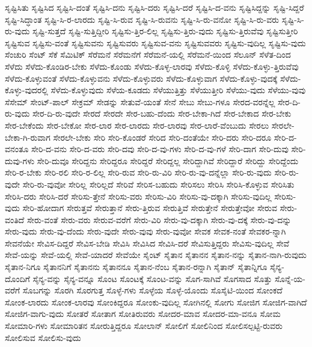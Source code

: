 {ಸೃಷ್ಟಿಸಿತು
ಸೃಷ್ಟಿಸಿದ
ಸೃಷ್ಟಿಸಿ-ದಂತೆ
ಸೃಷ್ಟಿಸಿ-ದನು
ಸೃಷ್ಟಿಸಿ-ದರು
ಸೃಷ್ಟಿಸಿ-ದರೆ
ಸೃಷ್ಟಿಸಿ-ದ-ವನು
ಸೃಷ್ಟಿಸಿದ್ದನ್ನು
ಸೃಷ್ಟಿ-ಸಿದ್ದರೆ
ಸೃಷ್ಟಿ-ಸಿದ್ಧಾಂತ
ಸೃಷ್ಟಿ-ಸಿ-ರ-ಲಾರದು
ಸೃಷ್ಟಿ-ಸಿ-ರುವ
ಸೃಷ್ಟಿ-ಸಿ-ರುವನು
ಸೃಷ್ಟಿ-ಸಿ-ರು-ವನೋ
ಸೃಷ್ಟಿ-ಸಿ-ರು-ವರು
ಸೃಷ್ಟಿ-ಸಿ-ರು-ವುದು
ಸೃಷ್ಟಿ-ಸುತ್ತದೆ
ಸೃಷ್ಟಿ-ಸುತ್ತಿದ್ದೀರಿ
ಸೃಷ್ಟಿಸು-ತ್ತಿರ-ಲಿಲ್ಲ
ಸೃಷ್ಟಿಸು-ತ್ತಿರು-ವುದು
ಸೃಷ್ಟಿಸು-ತ್ತಿರುವೆವು
ಸೃಷ್ಟಿಸುತ್ತೀರಿ
ಸೃಷ್ಟಿಸುವ
ಸೃಷ್ಟಿಸು-ವಂತೆ
ಸೃಷ್ಟಿಸುವನು
ಸೃಷ್ಟಿಸುವರು
ಸೃಷ್ಟಿಸುವ-ವನು
ಸೃಷ್ಟಿಸುವವರು
ಸೃಷ್ಟಿಸು-ವುದಿಲ್ಲ
ಸೃಷ್ಟಿಸು-ವುದು
ಸೆಂಚುರಿ
ಸೆಂಟ್
ಸೆಕೆ
ಸೆಮಿಟಿಕ್
ಸೆರೆಮನೆ
ಸೆರೆಮನೆಗೆ
ಸೆರೆಮನೆ-ಯಲ್ಲಿ
ಸೆರೆಮನೆ-ಯಿಂದ
ಸೆಲೂನ್
ಸೆಳೆತ-ದಿಂದ
ಸೆಳೆದು
ಸೆಳೆದು-ಕೊಂಡಿರ-ಬೇಕು
ಸೆಳೆದು-ಕೊಂಡು
ಸೆಳೆದು-ಕೊಳ್ಳ-ಲಾರವು
ಸೆಳೆದು-ಕೊಳ್ಳಿ
ಸೆಳೆದು-ಕೊಳ್ಳು-ತ್ತಿರುವೆವು
ಸೆಳೆದು-ಕೊಳ್ಳುವಂತೆ
ಸೆಳೆದು-ಕೊಳ್ಳುವನು
ಸೆಳೆದು-ಕೊಳ್ಳುವರು
ಸೆಳೆದು-ಕೊಳ್ಳುವಾಗ
ಸೆಳೆದು-ಕೊಳ್ಳು-ವುದಕ್ಕೆ
ಸೆಳೆದು-ಕೊಳ್ಳು-ವುದರಲ್ಲಿ
ಸೆಳೆದು-ಕೊಳ್ಳುವುದು
ಸೆಳೆಯ-ಕೂಡದು
ಸೆಳೆಯುತ್ತಿತ್ತು
ಸೆಳೆಯುತ್ತೀರಿ
ಸೆಳೆಯು-ವುದು
ಸೆಳೆಯು-ವುವು
ಸೆಸೇಮ್
ಸೇಂಟ್-ಪಾಲ್
ಸೇಕ್ರಮ್
ಸೇಡನ್ನು
ಸೇತುವೆ-ಯಂತೆ
ಸೇನೆ
ಸೇಬು
ಸೇಬು-ಗಳೂ
ಸೇರದ-ವರನ್ನೆಲ್ಲ
ಸೇರ-ದಿ-ರು-ವುದು
ಸೇರ-ದಿ-ರು-ವುದೇ
ಸೇರದೆ
ಸೇರದೇ
ಸೇರ-ಬಹು-ದೆಂದು
ಸೇರ-ಬೇಕಾ-ಗಿದೆ
ಸೇರ-ಬೇಕಾದ
ಸೇರ-ಬೇಕು
ಸೇರ-ಬೇಕೆಂದು
ಸೇರ-ಬೇಕೋ
ಸೇರ-ಲಾರ
ಸೇರ-ಲಾರದು
ಸೇರ-ಲಾರವು
ಸೇರ-ಲಾರೆ-ವೆಂಬುದು
ಸೇರಲು
ಸೇರಲೇ-ಬೇಕಾ-ಗಿ-ರುವಾಗ
ಸೇರಲೇ-ಬೇಕು
ಸೇರಿ
ಸೇರಿ-ಕೊಂಡರೆ
ಸೇರಿದ
ಸೇರಿ-ದಂತೆಯೇ
ಸೇರಿ-ದರು
ಸೇರಿ-ದರೂ
ಸೇರಿ-ದ-ವನಂತೂ
ಸೇರಿ-ದ-ವನು
ಸೇರಿ-ದ-ವರು
ಸೇರಿ-ದವು
ಸೇರಿ-ದ-ವು-ಗಳು
ಸೇರಿ-ದ-ವು-ಗಳೆ
ಸೇರಿ-ದಾಗ
ಸೇರಿ-ದುವು
ಸೇರಿ-ದುವು-ಗಳು
ಸೇರಿ-ದುವೂ
ಸೇರಿದ್ದನು
ಸೇರಿದ್ದರೂ
ಸೇರಿದ್ದರೆ
ಸೇರಿದ್ದಲ್ಲ
ಸೇರಿದ್ದಾಗಿವೆ
ಸೇರಿದ್ದಾರೆ
ಸೇರಿದ್ದು
ಸೇರಿದ್ದೆಂದು
ಸೇರಿ-ರ-ಬೇಕು
ಸೇರಿ-ರಲಿ
ಸೇರಿ-ರ-ಲಿಲ್ಲ
ಸೇರಿ-ರುವ
ಸೇರಿ-ರು-ವಿರಿ
ಸೇರಿ-ರು-ವು-ದನ್ನೆಲ್ಲಾ
ಸೇರಿ-ರು-ವುದು
ಸೇರಿ-ರು-ವುದೇ
ಸೇರಿ-ರು-ವುವೋ
ಸೇರಿಲ್ಲ
ಸೇರಿಲ್ಲದೆ
ಸೇರಿವೆ
ಸೇರಿಸ-ಬಹುದು
ಸೇರಿಸಲು
ಸೇರಿಸಿ
ಸೇರಿಸಿ-ಕೊಳ್ಳುವ
ಸೇರಿಸಿತು
ಸೇರಿಸಿ-ದರು
ಸೇರಿಸಿ-ದರೆ
ಸೇರಿಸು-ತ್ತೇನೆ
ಸೇರಿಸು-ವರು
ಸೇರಿಸು-ವಿರಿ
ಸೇರಿಸು-ವು-ದಕ್ಕಾಗಿ
ಸೇರಿಸು-ವುದಿಲ್ಲ
ಸೇರಿಸು-ವುದು
ಸೇರಿ-ಹೋದಾಗ
ಸೇರುತ್ತವೆ
ಸೇರುತ್ತಾನೆ
ಸೇರು-ತ್ತಿರುವ
ಸೇರುತ್ತಿವೆ
ಸೇರುತ್ತೇನೆ
ಸೇರುತ್ತೇವೋ
ಸೇರುವ
ಸೇರು-ವಂತಿದೆ
ಸೇರು-ವಂತೆ
ಸೇರು-ವರು
ಸೇರುವ-ವರೆಗೆ
ಸೇರು-ವಿರಿ
ಸೇರು-ವು-ದಕ್ಕಾಗಿ
ಸೇರು-ವು-ದಕ್ಕೆ
ಸೇರು-ವು-ದನ್ನು
ಸೇರು-ವುದು
ಸೇರು-ವು-ದೆಂದು
ಸೇರು-ವುದೇ
ಸೇರು-ವುವು
ಸೇರು-ವುವೋ
ಸೇವಕ
ಸೇವಕ-ನಂತೆ
ಸೇವಕರ-ನ್ನಾಗಿ
ಸೇವನೆಯೇ
ಸೇವಿಸ-ದಿದ್ದರೆ
ಸೇವಿಸ-ಬೇಡಿ
ಸೇವಿಸಿ
ಸೇವಿಸಿದ
ಸೇವಿಸಿ-ದರೆ
ಸೇವಿಸುತ್ತಿದ್ದರು
ಸೇವಿಸು-ವುದಿಲ್ಲ
ಸೇವೆ
ಸೇವೆ-ಯನ್ನು
ಸೇವೆ-ಯಲ್ಲಿ
ಸೇವೆ-ಯಾದರೆ
ಸೇವೆಯೇ
ಸೈಂಟ್
ಸೈತಾನ
ಸೈತಾನನ
ಸೈತಾನ-ನನ್ನು
ಸೈತಾನ-ನಾಗಿ-ರುವುದು
ಸೈತಾನ-ನಿಗೂ
ಸೈತಾನನಿಗೆ
ಸೈತಾನನು
ಸೈತಾನನೂ
ಸೈತಾನ-ನೆಂಬ
ಸೈತಾನ-ರನ್ನಾಗಿ
ಸೈತಾನ್
ಸೈತಾನ್ನಿಗೂ
ಸೈನ್ಯ-ದೊಂದಿಗೆ
ಸೈನ್ಯ-ವನ್ನು
ಸೈನ್ಯ-ವನ್ನೂ
ಸೊಂಟ
ಸೊಂಟಕ್ಕೆ
ಸೊಂಟ-ವನ್ನು
ಸೊಗ-ಸಾಗಿವೆ
ಸೊಗಸಾದ
ಸೊತ್ತು
ಸೊನ್ನೆ-ಯ-ವರೆಗೆ
ಸೊಬಗನ್ನು
ಸೊರಗಿ
ಸೊರಗುತ್ತ
ಸೊಳ್ಳೆ-ಗಳು
ಸೊಳ್ಳೆಯ
ಸೊಳ್ಳೆ-ಯೊಂದು
ಸೊಸೈಟಿ-ಯಿಂದ
ಸೋಂಕದೆ
ಸೋಂಕ-ಲಾರದು
ಸೋಂಕ-ಲಾರವು
ಸೋಂಕಿದ್ದರೂ
ಸೋಂಕು-ವುದಿಲ್ಲ
ಸೋಗಿನಲ್ಲಿ
ಸೋಗು
ಸೋಜಿಗ
ಸೋಜಿಗ-ವಾಗಿದೆ
ಸೋಜಿಗ-ವಾಗು-ವುದು
ಸೋತರೆ
ಸೋತಾಗ
ಸೋತಿರುವರು
ಸೋದರ-ಮಾವ
ಸೋದರ-ಮಾ-ವನೂ
ಸೋಮ
ಸೋಮಾರಿ-ಗಳು
ಸೋಮಾರಿತನ
ಸೋರುತ್ತಿದ್ದರೂ
ಸೋಲಾನ್
ಸೋಲಿಗೆ
ಸೋಲಿನಿಂದ
ಸೋಲಿಸಲ್ಪಟ್ಟಿ-ರುವರು
ಸೋಲಿಸುವ
ಸೋಲಿಸು-ವುದು
}

